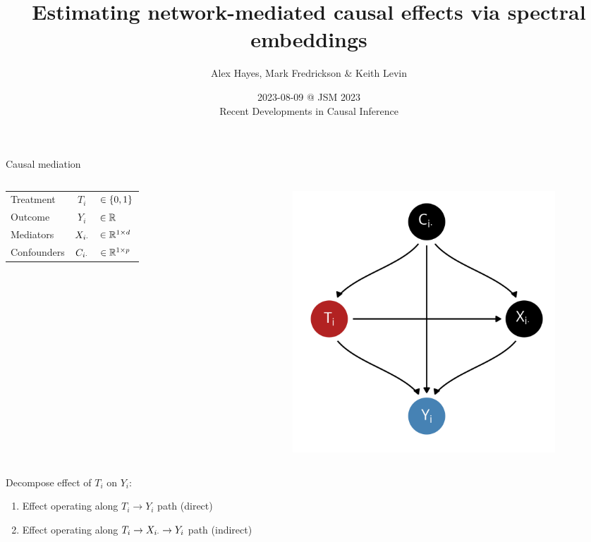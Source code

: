 \documentclass{beamer}
\title{Estimating network-mediated causal effects via spectral embeddings}
\date{2023-08-09 @ JSM 2023 \\ Recent Developments in Causal Inference}
\author{Alex Hayes, Mark Fredrickson \& Keith Levin}
\institute{Department of Statistics, University of Wisconsin-Madison}
\theoremstyle{remark}
\begin{document}
\maketitle


\begin{frame}{Causal mediation}

    \begin{columns}


        \begin{table}[]
            \begin{tabular}{lcl}
                Treatment   & $T_i$          & $\in \{0, 1\} $     \\
                Outcome     & $Y_i$          & $\in \mathbb{R}$              \\
                Mediators   & $X_{i \cdot}$ & $\in \mathbb{R}^{1 \times d}$ \\
                Confounders & $C_{i \cdot}$ & $\in \mathbb{R}^{1 \times p}$
            \end{tabular}
        \end{table}


        \begin{figure}[ht]
            \centering
            \includegraphics[width=0.9\textwidth]{figures/dags/mediating.png}
        \end{figure}
    \end{columns}

    Decompose effect of $T_i$ on $Y_i$:

    \begin{enumerate}
        \item Effect operating along $T_i \to Y_i$ path (direct)
        \item Effect operating along $T_i \to X_{i \cdot} \to Y_i$ path (indirect)
    \end{enumerate}

\end{frame}
\end{document}
